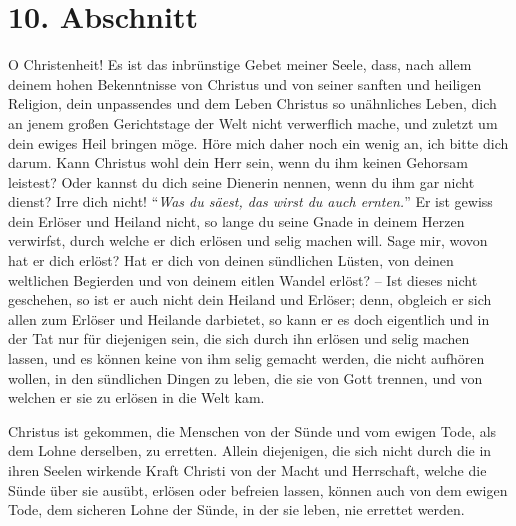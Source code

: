 \section{10. Abschnitt} \label{kap1_ab10}

O Christenheit!
Es ist das inbrünstige Gebet meiner Seele, dass, nach allem deinem hohen
Bekenntnisse von Christus und von seiner sanften und heiligen Religion, dein
unpassendes und dem Leben Christus so unähnliches Leben, dich an jenem großen
Gerichtstage der Welt nicht verwerflich mache, und zuletzt um dein ewiges Heil
bringen möge.
Höre mich daher noch ein wenig an,
ich bitte dich darum.
Kann Christus wohl dein Herr sein, wenn du ihm keinen Gehorsam leistest?
Oder kannst du dich seine Dienerin nennen, wenn du ihm gar nicht dienst? Irre
dich nicht!
"`\textit{Was du säest, das wirst du auch ernten.}"'
Er ist gewiss dein Erlöser und Heiland nicht, so lange du seine Gnade in deinem
Herzen verwirfst, durch welche er dich erlösen und selig machen will.
Sage mir, wovon hat er dich erlöst? 
Hat er dich von deinen sündlichen Lüsten, von deinen weltlichen Begierden und
von deinem eitlen Wandel erlöst?
-- Ist dieses nicht geschehen, so ist er auch nicht dein Heiland und Erlöser;
denn, obgleich er sich allen zum Erlöser und Heilande darbietet, so kann er es
doch eigentlich und in der Tat nur für diejenigen sein, die sich durch ihn
erlösen und selig machen lassen,
und es können keine von ihm selig gemacht werden, die nicht aufhören wollen, in
den sündlichen Dingen zu leben, die sie von Gott trennen, und von welchen er sie
zu erlösen in die Welt kam.

\medskip

Christus ist gekommen, die Menschen von der Sünde und vom ewigen Tode, als dem
Lohne derselben, zu erretten.
Allein diejenigen, die sich nicht durch die in ihren Seelen wirkende Kraft
Christi von der Macht und Herrschaft, welche die Sünde über sie ausübt, erlösen
oder befreien lassen, können auch von dem ewigen Tode, dem sicheren Lohne der
Sünde, in der sie leben, nie errettet werden.

\medskip


